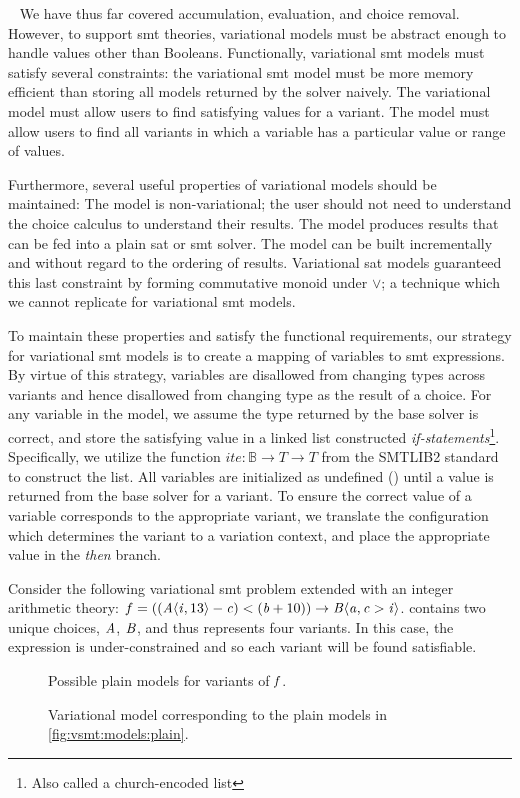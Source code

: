 ~\label{section:vsmt:models}
We have thus far covered accumulation, evaluation, and choice removal. However,
to support \ac{smt} theories, variational models must be abstract enough to
handle values other than Booleans. Functionally, variational \ac{smt} models
must satisfy several constraints: the variational \ac{smt} model must be more
memory efficient than storing all models returned by the solver naively. The
variational model must allow users to find satisfying values for a variant. The
model must allow users to find all variants in which a variable has a particular
value or range of values.

Furthermore, several useful properties of variational models should be
maintained: The model is non-variational; the user should not need to understand
the choice calculus to understand their results. The model produces results that
can be fed into a plain \ac{sat} or \ac{smt} solver. The model can be built
incrementally and without regard to the ordering of results. Variational
\ac{sat} models guaranteed this last constraint by forming commutative monoid
under $\vee$; a technique which we cannot replicate for variational \ac{smt}
models.

To maintain these properties and satisfy the functional requirements, our
strategy for variational \ac{smt} models is to create a mapping of variables to
\ac{smt} expressions. By virtue of this strategy, variables are disallowed from
changing types across variants and hence disallowed from changing type as the
result of a choice. For any variable in the model, we assume the type returned
by the base solver is correct, and store the satisfying value in a linked list
constructed \emph{if-statements}\footnote{Also called a church-encoded list}.
Specifically, we utilize the function $ite : \mathbb{B} \rightarrow T
\rightarrow T$ from the SMTLIB2 standard to construct the list. All variables
are initialized as undefined (\undefined) until a value is returned from the
base solver for a variant. To ensure the correct value of a variable corresponds
to the appropriate variant, we translate the configuration which determines the
variant to a variation context, and place the appropriate value in the
\emph{then} branch.

Consider the following variational \ac{smt} problem extended with an integer
arithmetic theory: $f = ((\chc[A]{\iV{}, 13} - \cV{}) < (\bV + 10)) \rightarrow
\chc[B]{\aV{}, \cV{} > \iV{}}$. \fV{} contains two unique choices, $\mathit{A}$,
$\mathit{B}$, and thus represents four variants. In this case, the expression is
under-constrained and so each variant will be found satisfiable.
% 
\begin{figure}[h]
  \centering
  
  \caption{Possible plain models for variants of $\mathit{f}$.}%
  \label{fig:vsmt:models:plain}
\end{figure}
\begin{figure}[h]
  \centering
  
  \caption{Variational model corresponding to the plain models in
    \autoref{fig:vsmt:models:plain}.}%
  \label{fig:vsmt:models:var}
\end{figure}

